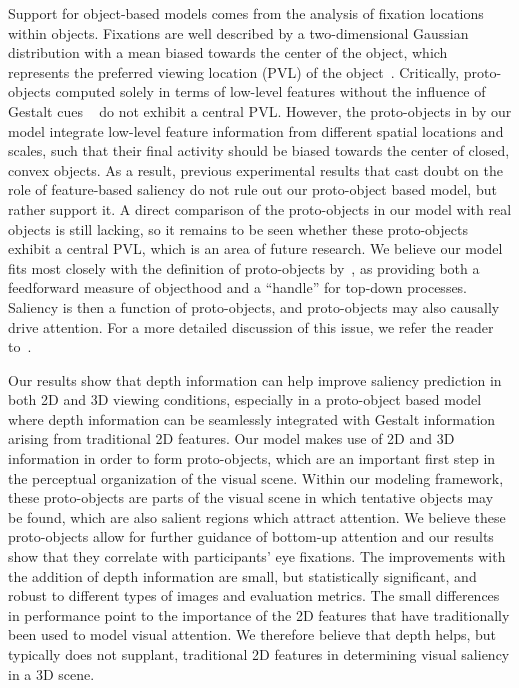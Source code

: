 Support for object-based models comes from the analysis of fixation locations within objects. Fixations are well described by a two-dimensional Gaussian distribution with a mean biased towards the center of the object, which represents the preferred viewing location (PVL) of the object~\citep{Nuthman_Henderson10}. Critically, proto-objects computed solely in terms of low-level features without the influence of Gestalt cues ~\citep{Walther_Koch06} do not exhibit a central PVL. However, the proto-objects in by our model integrate low-level feature information from different spatial locations and scales, such that their final activity should be biased towards the center of closed, convex objects. As a result, previous experimental results that cast doubt on the role of feature-based saliency \citep{Einhauser_etal08a,Nuthman_Henderson10,Stoll_etal15} do not rule out our proto-object based model, but rather support it. A direct comparison of the proto-objects in our model with real objects is still lacking, so it remains to be seen whether these proto-objects exhibit a central PVL, which is an area of future research. We believe our model fits most closely with the definition of proto-objects by~\cite{Rensink00a},  as providing both a feedforward measure of objecthood and a ``handle'' for top-down processes. Saliency is then a function of proto-objects, and proto-objects may also causally drive
attention. For a more detailed discussion of this issue, we refer the
reader to~\citet{Russell_etal14}.
 
Our results show that depth information can help improve saliency prediction in both 2D and 3D viewing conditions, especially in a
proto-object based model where depth information can be seamlessly
integrated with Gestalt information arising from traditional 2D features. Our model makes use of 2D and 3D information in order to
form proto-objects, which are an important first step in the perceptual organization of the visual scene.  Within our modeling
framework, these proto-objects are parts of the visual scene in which
tentative objects may be found, which are also salient regions which
attract attention. We believe these proto-objects allow for further
guidance of bottom-up attention and our results show that they correlate with participants' eye fixations. The improvements with the
addition of depth information are small, but statistically significant, and robust to different types of images and evaluation
metrics. The small differences in performance point to the importance
of the 2D features that have traditionally been used to model visual
attention. We therefore believe that depth helps, but typically does not supplant, traditional 2D features in determining visual saliency in a 3D scene.

